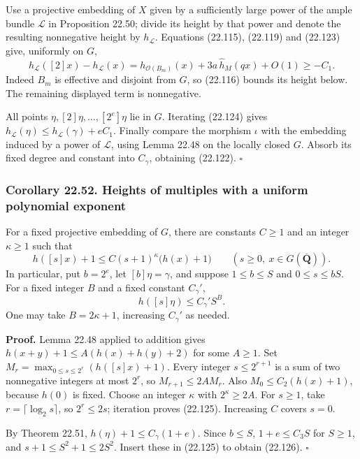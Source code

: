 \documentclass[
  11pt,
  a4paper,
]{article}
\begin{document}
Use a projective embedding of \(X\) given by a sufficiently large power
of the ample bundle \(\mathcal L\) in Proposition 22.50; divide its
height by that power and denote the resulting nonnegative height by
\(h_{\mathcal L}\). Equations (22.115), (22.119) and (22.123) give,
uniformly on \(G\), \[
 h_{\mathcal L}([2]x)-h_{\mathcal L}(x)
 =h_{\mathcal O(B_m)}(x)+3a\,\widehat h_M(qx)+O(1)\ge-C_1.
 \tag{22.124}
\] Indeed \(B_m\) is effective and disjoint from \(G\), so (22.116)
bounds its height below. The remaining displayed term is nonnegative.

All points \(\eta,[2]\eta,\ldots,[2^e]\eta\) lie in \(G\). Iterating
(22.124) gives \(h_{\mathcal L}(\eta)\le h_{\mathcal L}(\gamma)+eC_1\).
Finally compare the morphism \(\iota\) with the embedding induced by a
power of \(\mathcal L\), using Lemma 22.48 on the locally closed \(G\).
Absorb its fixed degree and constant into \(C_\gamma\), obtaining
(22.122). \(\square\)

\subsubsection{Corollary 22.52. Heights of multiples with a uniform
polynomial
exponent}\label{corollary-22.52.-heights-of-multiples-with-a-uniform-polynomial-exponent}

For a fixed projective embedding of \(G\), there are constants \(C\ge1\)
and an integer \(\kappa\ge1\) such that \[
 h([s]x)+1\le C(s+1)^\kappa\bigl(h(x)+1\bigr)
 \qquad(s\ge0,\ x\in G(\overline{\mathbf Q})).
 \tag{22.125}
\] In particular, put \(b=2^e\), let \([b]\eta=\gamma\), and suppose
\(1\le b\le S\) and \(0\le s\le bS\). For a fixed integer \(B\) and a
fixed constant \(C_\gamma'\), \[
 h([s]\eta)\le C_\gamma'S^B.
 \tag{22.126}
\] One may take \(B=2\kappa+1\), increasing \(C_\gamma'\) as needed.

\textbf{Proof.} Lemma 22.48 applied to addition gives
\(h(x+y)+1\le A(h(x)+h(y)+2)\) for some \(A\ge1\). Set
\(M_r=\max_{0\le s\le2^r}(h([s]x)+1)\). Every integer \(s\le2^{r+1}\) is
a sum of two nonnegative integers at most \(2^r\), so
\(M_{r+1}\le2A M_r\). Also \(M_0\le C_2(h(x)+1)\), because \(h(0)\) is
fixed. Choose an integer \(\kappa\) with \(2^\kappa\ge2A\). For
\(s\ge1\), take \(r=\lceil\log_2 s\rceil\), so \(2^r\le2s\); iteration
proves (22.125). Increasing \(C\) covers \(s=0\).

By Theorem 22.51, \(h(\eta)+1\le C_\gamma(1+e)\). Since \(b\le S\),
\(1+e\le C_3 S\) for \(S\ge1\), and \(s+1\le S^2+1\le2S^2\). Insert
these in (22.125) to obtain (22.126). \(\square\)
\end{document}
